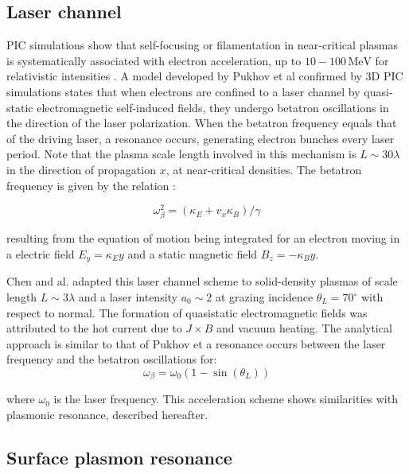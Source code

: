 \subsection{Laser channel}


PIC simulations show that self-focusing or filamentation in near-critical plasmas is systematically associated with electron acceleration, up to $10-100\,\mathrm{MeV}$ for relativistic intensities \cite{askar1994magnetic,pukhov1996relativistic}. A model developed by Pukhov et al \cite{pukhov1999particle} confirmed by 3D PIC simulations states that when electrons are confined to a laser channel by quasi-static electromagnetic self-induced fields, they undergo betatron oscillations in  the direction of the laser polarization. When the betatron frequency equals that of the driving laser, a resonance occurs, generating electron bunches every laser period. Note that the plasma scale length involved in this mechanism is $L\sim 30\lambda$ in the direction of propagation $x$, at near-critical densities. The betatron frequency is given by the relation \cite{pukhov1999particle}:

\begin{equation}
\omega_{\beta}^2 = (\kappa_E + v_x \kappa_B)/\gamma
\end{equation}

\noindent resulting from the equation of motion being integrated for an electron moving in a electric field $E_y = \kappa_E y$ and a static magnetic field $B_z = -\kappa_B y$. 


\noindent Chen and al. \cite{chen2006surface} adapted this laser channel scheme to solid-density plasmas of scale length $L\sim 3\lambda$ and a laser intensity $a_0 \sim 2$ at grazing incidence $\theta_L = 70^{\circ}$ with respect to normal. The formation of quasistatic electromagnetic fields was attributed to the hot current due to $J\times B$ and vacuum heating.
The analytical approach is similar to that of Pukhov et a resonance occurs between the laser frequency and the betatron oscillations for:
\begin{equation}
\omega_{\beta} = \omega_0(1 - \sin(\theta_L))
\end{equation}

\noindent where $\omega_0$ is the laser frequency. This acceleration scheme shows similarities with plasmonic resonance, described hereafter.

\subsection{Surface plasmon resonance}

